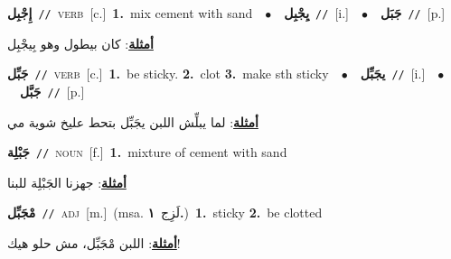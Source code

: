 \documentclass[10pt,a4paper,twoside]{article} %
\begin{document}
\begin{multicols}{2}
{{{\setlength\topsep{0pt}\textbf{\foreignlanguage{arabic}{إِجْبِل}}\ {\color{gray}\texttt{//}\color{black}}\ \textsc{verb}\ [c.]\ \textbf{1.}~mix cement with sand\ \ $\bullet$\ \ \setlength\topsep{0pt}\textbf{\foreignlanguage{arabic}{يِجْبِل}}\ {\color{gray}\texttt{//}\color{black}}\ [i.]\ \ $\bullet$\ \ \setlength\topsep{0pt}\textbf{\foreignlanguage{arabic}{جَبَل}}\ {\color{gray}\texttt{//}\color{black}}\ [p.]\  \begin{flushright}\color{gray}\foreignlanguage{arabic}{\textbf{\underline{\foreignlanguage{arabic}{أمثلة}}}: كان بيطول وهو بِيجْبِل}\end{flushright}\color{black}} \vspace{2mm}

{\setlength\topsep{0pt}\textbf{\foreignlanguage{arabic}{جَبِّل}}\ {\color{gray}\texttt{//}\color{black}}\ \textsc{verb}\ [c.]\ \textbf{1.}~be sticky.  \textbf{2.}~clot  \textbf{3.}~make sth sticky\ \ $\bullet$\ \ \setlength\topsep{0pt}\textbf{\foreignlanguage{arabic}{يجَبِّل}}\ {\color{gray}\texttt{//}\color{black}}\ [i.]\ \ $\bullet$\ \ \setlength\topsep{0pt}\textbf{\foreignlanguage{arabic}{جَبَّل}}\ {\color{gray}\texttt{//}\color{black}}\ [p.]\  \begin{flushright}\color{gray}\foreignlanguage{arabic}{\textbf{\underline{\foreignlanguage{arabic}{أمثلة}}}: لما يبلِّش اللبن يجَبِّل بتحط عليخ شوية مي}\end{flushright}\color{black}} \vspace{2mm}

{\setlength\topsep{0pt}\textbf{\foreignlanguage{arabic}{جَبْلِة}}\ {\color{gray}\texttt{//}\color{black}}\ \textsc{noun}\ [f.]\ \textbf{1.}~mixture of cement with sand\  \begin{flushright}\color{gray}\foreignlanguage{arabic}{\textbf{\underline{\foreignlanguage{arabic}{أمثلة}}}: جهزنا الجَبْلِة للبنا}\end{flushright}\color{black}} \vspace{2mm}

{\setlength\topsep{0pt}\textbf{\foreignlanguage{arabic}{مْجَبِّل}}\ {\color{gray}\texttt{//}\color{black}}\ \textsc{adj}\ [m.]\ \color{gray}(msa. \foreignlanguage{arabic}{لَزِج}~\foreignlanguage{arabic}{\textbf{١.}})\color{black}\ \textbf{1.}~sticky  \textbf{2.}~be clotted\  \begin{flushright}\color{gray}\foreignlanguage{arabic}{\textbf{\underline{\foreignlanguage{arabic}{أمثلة}}}: اللبن مْجَبِّل، مش حلو هيك!}\end{flushright}\color{black}} \vspace{2mm}

}}
\end{multicols}
\end{document}
